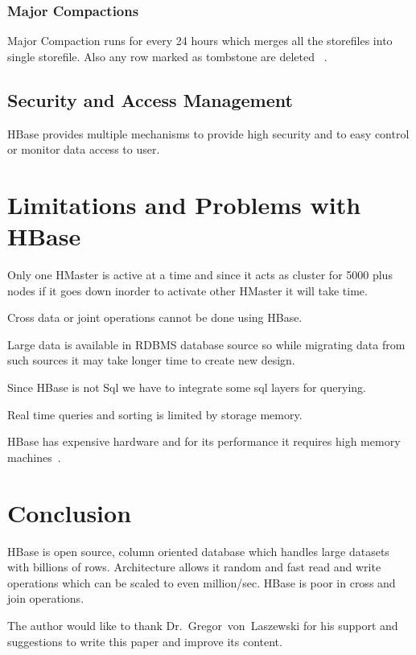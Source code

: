 \subsubsection{Major Compactions}
Major Compaction runs for every 24 hours which merges all the storefiles into 
single storefile. Also any row marked as tombstone are deleted
~\cite{hid-sp18-421-HBase-tableoper}.


\subsection{Security and Access Management} 

HBase provides multiple mechanisms to provide high security and to easy control
or monitor data access to user.

\section{Limitations and Problems with HBase}
\begin{description}
  \item Only one HMaster is active at a time and since it acts as cluster for 5000 plus 
nodes if it goes down inorder to activate other HMaster it will take time.
 \item Cross data or joint operations cannot be done using HBase.
 \item Large data is available in RDBMS database source so while migrating data
 from such sources it may take longer time to create new design.
 \item Since HBase is not Sql we have to integrate some sql layers for querying.
 \item Real time queries and sorting is limited by storage memory.
 \item HBase has expensive hardware and for its performance it requires high 
 memory machines~\cite{hid-sp18-421-HBase-limitations}.
\end{description}

\section{Conclusion}
HBase is open source, column oriented database which handles large datasets with
billions of rows. Architecture allows it random and fast read and write operations
which can be scaled to even million/sec. HBase is poor in cross and join operations. 

\begin{acks}

The author would like to thank Dr.~Gregor~von~Laszewski for his support and
suggestions to write this paper and improve its content.

\end{acks}



 


